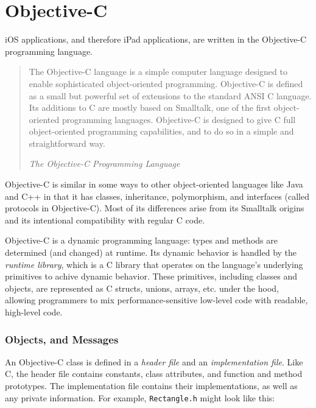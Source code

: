 \section{Objective-C}
\label{sect:objc}

iOS applications, and therefore iPad applications, are written in the
Objective-C programming language.

\begin{quote}

    The Objective-C language is a simple computer language designed to enable
    sophisticated object-oriented programming. Objective-C is defined as a small
    but powerful set of extensions to the standard ANSI C language. Its
    additions to C are mostly based on Smalltalk, one of the first
    object-oriented programming languages. Objective-C is designed to give C
    full object-oriented programming capabilities, and to do so in a simple and
    straightforward way.

    \raggedleft \em The Objective-C Programming Language \cite{objc:manual}

\end{quote}

Objective-C is similar in some ways to other object-oriented languages like Java
and C++ in that it has classes, inheritance, polymorphism, and interfaces
(called protocols in Objective-C). Most of its differences arise from its
Smalltalk origins and its intentional compatibility with regular C code.

Objective-C is a dynamic programming language: types and methods are determined
(and changed) at runtime. Its dynamic behavior is handled by the \emph{runtime
library}, which is a C library that operates on the language's underlying
primitives to achive dynamic behavior. These primitives, including classes and
objects, are represented as C structs, unions, arrays, etc. under the hood,
allowing programmers to mix performance-sensitive low-level code with readable,
high-level code.

\subsubsection{Objects, and Messages}
\label{sect:objc_objects}

An Objective-C class is defined in a \emph{header file} and an
\emph{implementation file}. Like C, the header file contains constants, class
attributes, and function and method prototypes. The implementation file contains
their implementations, as well as any private information. For example,
\texttt{Rectangle.h} might look like this:

